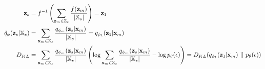 \documentclass[11pt, english]{article}
\begin{document}
    \begin{equation}
        \begin{split}
            \zs&=f^{-1}\left(\sum _{\zm \in \mathbb{Z}_s} \frac{f(\zm)}{|\xsubset|}\right) =\textbf{z}_1\\
            \tilde{q}_{\phi}(\textbf{z}_s|\xsubset) &= \sum _{\samplem \in \xsubset} \frac{q_{\phi_m}(\zs|\samplem)}{|\xsubset|} =q_{\phi_1}(\textbf{z}_1|\samplem)\\
            D_{KL}&=\sum _{\samplem \in \xsubset} \frac{q_{\phi_m}(\zs|\samplem)}{|\xsubset|}\left(\log \sum _{\samplem \in \xsubset} \frac{q_{\phi_m}(\zs|\samplem)}{|\xsubset|} - \log p_{\theta}(\epsilon) \right)= D_{KL}(q_{\phi_1}(\textbf{z}_1|\samplem)\ ||\ p_{\theta}(\epsilon))
        \end{split}
    \end{equation}
\end{document}
